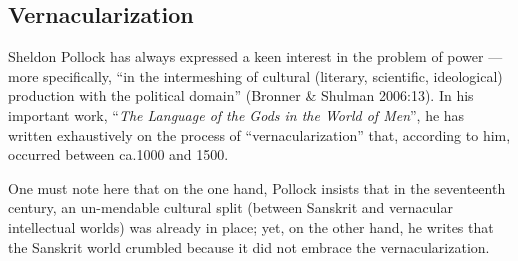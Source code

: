 \subsection{Vernacularization}%

Sheldon Pollock has always expressed a keen interest in the problem of power — more specifically, “in the intermeshing of cultural (literary, scientific, ideological) production with the political domain” (Bronner \& Shulman 2006:13). In his important work, “{\em The Language of the Gods in the World of Men}”, he has written exhaustively on the process of “vernacularization” that, according to him, occurred between ca.1000 and 1500.

One must note here that on the one hand, Pollock insists that in the seventeenth century, an un-mendable cultural split (between Sanskrit and vernacular intellectual worlds) was already in place; yet, on the other hand, he writes that the Sanskrit world crumbled because it did not embrace the vernacularization.

